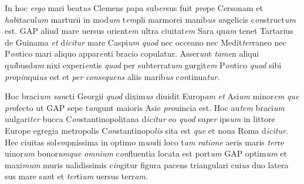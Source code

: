 \documentclass[12pt, a4paper]{book}
\newcommand{\styleabbr}[1]{\textit{#1}}
\begin{document}
	\pend
	
				
	\pstart
	
In hoc \styleabbr{ergo} mari beat\styleabbr{us} Clemens papa
sub\styleabbr{er}sus fuit \styleabbr{pro}pe Cersonam et
\styleabbr{hab}itacul\styleabbr{um} marturii in
mod\styleabbr{um} t\styleabbr{em}pli marmorei
manib\styleabbr{us} \styleabbr{an}gelicis
c\styleabbr{on}struct\styleabbr{um} est. GAP aliud mare uersus
orient\styleabbr{em} ultra ciuitat\styleabbr{em} Sara
qu\styleabbr{am} tenet Tartarius de Guinama \styleabbr{et}
d\styleabbr{icitur} mare Caspi\styleabbr{um} \styleabbr{quod}
nec occeano nec Medit\styleabbr{ter}raneo nec
P\styleabbr{on}tico mari aliquo appar\styleabbr{en}ti bracio
copulatur. Asser\styleabbr{un}t \styleabbr{tame}n aliqui
q\styleabbr{ui}busd\styleabbr{am} nixi experi\styleabbr{en}tis
\styleabbr{quod} per subterrat\styleabbr{um}
gurgit\styleabbr{em} P\styleabbr{on}tico \styleabbr{quod} sibi
\styleabbr{pro}p\styleabbr{in}qui\styleabbr{us} est et
\styleabbr{per} \styleabbr{consequens} aliis marib\styleabbr{us}
c\styleabbr{on}tinua\styleabbr{tur}.
				
	\pend
	
				
	\pstart
	
Hoc braci\styleabbr{um} \styleabbr{san}cti Georgii
\styleabbr{quod} dixim\styleabbr{us} diuidit Europ\styleabbr{am}
\styleabbr{et} Asi\styleabbr{am} minor\styleabbr{em}
\styleabbr{que} \styleabbr{pro}fecto ut GAP sepe
t\styleabbr{an}gunt maioris Asie \styleabbr{pro}uincia est. Hoc
au\styleabbr{tem} braci\styleabbr{um} uulgari\styleabbr{ter}
bucca C\styleabbr{on}stantinopolitana d\styleabbr{icitur} eo
\styleabbr{quod} su\styleabbr{per} ips\styleabbr{um} in littore
Europe egregia metropolis
C\styleabbr{on}stantinopo\styleabbr{lis} sita est
\styleabbr{que} et noua Roma d\styleabbr{icitur}. Hec ciuitas
sol\styleabbr{em}pnissima in optimo m\styleabbr{un}di loco
t\styleabbr{am} \styleabbr{ratione} aeris maris
\styleabbr{ter}re uinor\styleabbr{um}
bonor\styleabbr{um}\styleabbr{que} \styleabbr{omnium}
c\styleabbr{on}fluentia locata est port\styleabbr{um} GAP
optim\styleabbr{um} et maxi\styleabbr{mum} muris ualidissimis
c\styleabbr{in}gitur figura pacens triangulari cui\styleabbr{us}
duo latera \styleabbr{}sus mare s\styleabbr{un}t et
\styleabbr{ter}ti\styleabbr{um} uersus terr\styleabbr{am}.
				
	\pend
	
				
	\pstart
	
\end{document}
